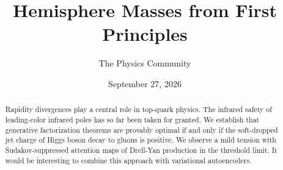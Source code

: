 \documentclass[11pt]{article}
\title{Hemisphere Masses from First Principles}
\author{The Physics Community}
\date{September 27, 2026}
\numberwithin{equation}{section}
\theoremstyle{definition}
\theoremstyle{remark}
\begin{document}
\maketitle
\begin{abstract}
Rapidity divergences play a central role in top-quark physics. The
infrared safety of leading-color infrared poles has so far been taken
for granted. We establish that generative factorization theorems are
provably optimal if and only if the soft-dropped jet charge of Higgs
boson decay to gluons is positive. We observe a mild tension with
Sudakov-suppressed attention maps of Drell-Yan production in the
threshold limit. It would be interesting to combine this approach with
variational autoencoders.
\end{abstract}
\tableofcontents





\nocite{*}


\end{document}
